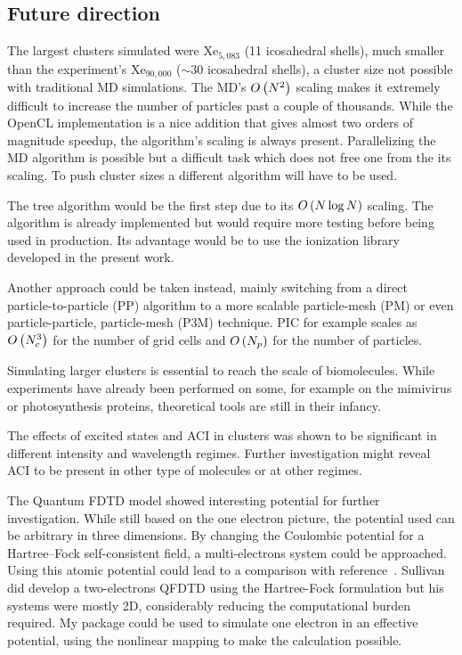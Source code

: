 \subsection{Future direction}

The largest clusters simulated were Xe$_{5,083}$ (11
icosahedral shells), much smaller than the experiment's Xe$_{90,000}$
($\sim$30 icosahedral shells), a cluster size not possible with traditional
MD simulations. The MD's $O\left( N^2 \right)$ scaling makes it extremely difficult
to increase the number of particles past a couple of thousands. While
the OpenCL implementation is a nice addition that gives almost two orders
of magnitude speedup, the algorithm's scaling is always present.
Parallelizing the MD algorithm is possible but a difficult task which does
not free one from the its scaling. To push cluster sizes a different
algorithm will have to be used.

The tree algorithm would be the first step due to its $O\left( N \log N \right)$ scaling.
The algorithm is already implemented but would require more testing
before being used in production. Its advantage would be to use the
ionization library developed in the present work.

Another approach could be taken instead,
mainly switching from a direct particle-to-particle (PP) algorithm to a more
scalable particle-mesh (PM) or even particle-particle, particle-mesh (P3M)
technique. PIC for example scales as $O\left( N_c^3 \right)$ for the number of grid cells and
$O\left( N_p \right)$ for the number of particles.

Simulating larger clusters is essential to reach the scale of biomolecules.
While experiments have already been performed on some, for example
on the mimivirus or photosynthesis proteins, theoretical tools are still
in their infancy.

The effects of excited states and ACI in clusters was shown to be significant
in different intensity and wavelength regimes. Further investigation might
reveal ACI to be present in other type of molecules or at other regimes.

The Quantum FDTD model showed interesting potential for further investigation.
While still based on the one electron picture, the potential used can
be arbitrary in three dimensions. By changing the Coulombic potential
for a Hartree–Fock self-consistent field, a multi-electrons system
could be approached. Using this atomic potential could lead to a comparison
with reference~\cite{Walters2006}.
Sullivan did develop a two-electrons QFDTD using the
Hartree-Fock formulation but his systems were mostly 2D, considerably reducing
the computational burden required. My package could be used to simulate one
electron in an effective potential, using the nonlinear mapping to make the
calculation possible.

